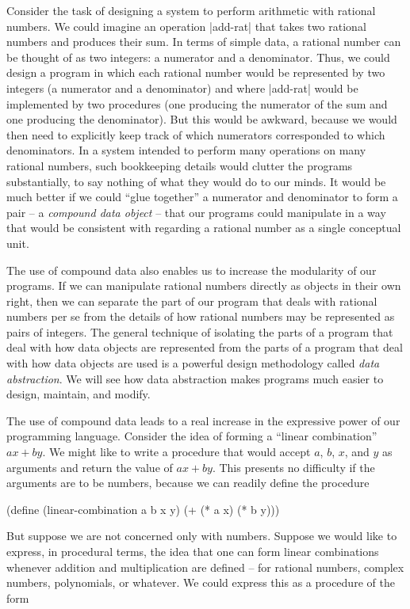 Consider the task of designing a system to perform arithmetic with
rational numbers.  We could imagine an operation \scheme|add-rat| that
takes two rational numbers and produces their sum.  In terms of simple
data, a rational number can be thought of as two integers: a numerator
and a denominator.  Thus, we could design a program in which each
rational number would be represented by two integers (a numerator and
a denominator) and where \scheme|add-rat| would be implemented by two
procedures (one producing the numerator of the sum and one producing
the denominator).  But this would be awkward, because we would then
need to explicitly keep track of which numerators corresponded to
which denominators.  In a system intended to perform many operations
on many rational numbers, such bookkeeping details would clutter the
programs substantially, to say nothing of what they would do to our
minds.  It would be much better if we could ``glue together'' a
numerator and denominator to form a pair -- a \textit{compound data
  object} -- that our programs could manipulate in a way that would be
consistent with regarding a rational number as a single conceptual
unit.

The use of compound data also enables us to increase the modularity of
our programs.  If we can manipulate rational numbers directly as
objects in their own right, then we can separate the part of our
program that deals with rational numbers per se from the details of
how rational numbers may be represented as pairs of integers.  The
general technique of isolating the parts of a program that deal with
how data objects are represented from the parts of a program that deal
with how data objects are used is a powerful design methodology called
\textit{data abstraction}.  We will see how data abstraction makes
programs much easier to design, maintain, and modify.

The use of compound data leads to a real increase in the expressive
power of our programming language.  Consider the idea of forming a
``linear combination'' $ax + by$.  We might like to write a procedure
that would accept $a$, $b$, $x$, and $y$ as arguments and return the
value of $ax + by$.  This presents no difficulty if the arguments are
to be numbers, because we can readily define the procedure

\begin{schemedisplay}
(define (linear-combination a b x y) 
  (+ (* a x) (* b y)))
\end{schemedisplay}
But suppose we are not concerned only with numbers.  Suppose we would
like to express, in procedural terms, the idea that one can form
linear combinations whenever addition and multiplication are
defined -- for rational numbers, complex numbers, polynomials, or
whatever.  We could express this as a procedure of the form

